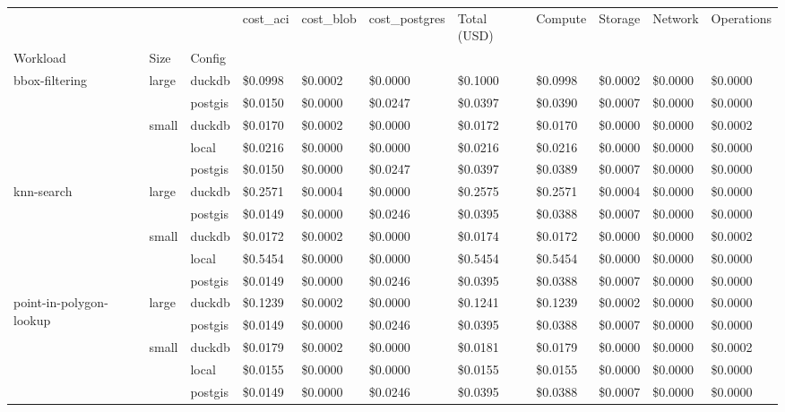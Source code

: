 \begin{tabular}{lllllllllll}
\toprule
 &  &  & cost_aci & cost_blob & cost_postgres & Total (USD) & Compute & Storage & Network & Operations \\
Workload & Size & Config &  &  &  &  &  &  &  &  \\
\midrule
\multirow[t]{5}{*}{bbox-filtering} & \multirow[t]{2}{*}{large} & duckdb & \$0.0998 & \$0.0002 & \$0.0000 & \$0.1000 & \$0.0998 & \$0.0002 & \$0.0000 & \$0.0000 \\
 &  & postgis & \$0.0150 & \$0.0000 & \$0.0247 & \$0.0397 & \$0.0390 & \$0.0007 & \$0.0000 & \$0.0000 \\
\cline{2-11}
 & \multirow[t]{3}{*}{small} & duckdb & \$0.0170 & \$0.0002 & \$0.0000 & \$0.0172 & \$0.0170 & \$0.0000 & \$0.0000 & \$0.0002 \\
 &  & local & \$0.0216 & \$0.0000 & \$0.0000 & \$0.0216 & \$0.0216 & \$0.0000 & \$0.0000 & \$0.0000 \\
 &  & postgis & \$0.0150 & \$0.0000 & \$0.0247 & \$0.0397 & \$0.0389 & \$0.0007 & \$0.0000 & \$0.0000 \\
\cline{1-11} \cline{2-11}
\multirow[t]{5}{*}{knn-search} & \multirow[t]{2}{*}{large} & duckdb & \$0.2571 & \$0.0004 & \$0.0000 & \$0.2575 & \$0.2571 & \$0.0004 & \$0.0000 & \$0.0000 \\
 &  & postgis & \$0.0149 & \$0.0000 & \$0.0246 & \$0.0395 & \$0.0388 & \$0.0007 & \$0.0000 & \$0.0000 \\
\cline{2-11}
 & \multirow[t]{3}{*}{small} & duckdb & \$0.0172 & \$0.0002 & \$0.0000 & \$0.0174 & \$0.0172 & \$0.0000 & \$0.0000 & \$0.0002 \\
 &  & local & \$0.5454 & \$0.0000 & \$0.0000 & \$0.5454 & \$0.5454 & \$0.0000 & \$0.0000 & \$0.0000 \\
 &  & postgis & \$0.0149 & \$0.0000 & \$0.0246 & \$0.0395 & \$0.0388 & \$0.0007 & \$0.0000 & \$0.0000 \\
\cline{1-11} \cline{2-11}
\multirow[t]{5}{*}{point-in-polygon-lookup} & \multirow[t]{2}{*}{large} & duckdb & \$0.1239 & \$0.0002 & \$0.0000 & \$0.1241 & \$0.1239 & \$0.0002 & \$0.0000 & \$0.0000 \\
 &  & postgis & \$0.0149 & \$0.0000 & \$0.0246 & \$0.0395 & \$0.0388 & \$0.0007 & \$0.0000 & \$0.0000 \\
\cline{2-11}
 & \multirow[t]{3}{*}{small} & duckdb & \$0.0179 & \$0.0002 & \$0.0000 & \$0.0181 & \$0.0179 & \$0.0000 & \$0.0000 & \$0.0002 \\
 &  & local & \$0.0155 & \$0.0000 & \$0.0000 & \$0.0155 & \$0.0155 & \$0.0000 & \$0.0000 & \$0.0000 \\
 &  & postgis & \$0.0149 & \$0.0000 & \$0.0246 & \$0.0395 & \$0.0388 & \$0.0007 & \$0.0000 & \$0.0000 \\
\cline{1-11} \cline{2-11}
\bottomrule
\end{tabular}
